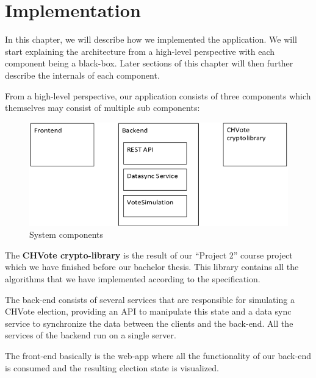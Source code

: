 \chapter{Implementation}
In this chapter, we will describe how we implemented the application. We will start explaining the architecture from a high-level perspective with each component being a black-box. Later sections of this chapter will then further describe the internals of each component.

From a high-level perspective, our application consists of three components which themselves may consist of multiple sub components:
\begin{figure}[h!]
\begin{center}
\includegraphics[scale=0.95]{assets/componentdiagram.png}
\caption{System components}
\end{center}
\end{figure}
The \textbf{CHVote crypto-library} is the result of our "`Project 2"' course project which we have finished before our bachelor thesis. This library contains all the algorithms that we have implemented according to the specification. 

The back-end consists of several services that are responsible for simulating a CHVote election, providing an API to manipulate this state and a data sync service to synchronize the data between the clients and the back-end. All the services of the backend run on a single server.

The front-end basically is the web-app where all the functionality of our back-end is consumed and the resulting election state is visualized.
